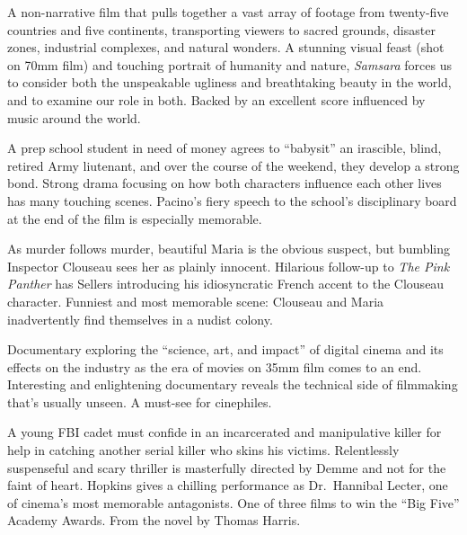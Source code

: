   A non-narrative film that pulls together a vast array of footage from twenty-five countries and five continents, transporting viewers to sacred grounds, disaster zones, industrial complexes, and natural wonders. A stunning visual feast (shot on 70mm film) and touching portrait of humanity and nature, \textit{Samsara} forces us to consider both the unspeakable ugliness and breathtaking beauty in the world, and to examine our role in both. Backed by an excellent score influenced by music around the world. \author{DW} 

   A prep school student in need of money agrees to ``babysit'' an irascible, blind, retired Army liutenant, and over the course of the weekend, they develop a strong bond. Strong drama focusing on how both characters influence each other lives has many touching scenes. Pacino's fiery speech to the school's disciplinary board at the end of the film is especially memorable. \author{DW} 

   As murder follows murder, beautiful Maria is the obvious suspect, but bumbling Inspector Clouseau sees her as plainly innocent. Hilarious follow-up to \textit{The Pink Panther} has Sellers introducing his idiosyncratic French accent to the Clouseau character. Funniest and most memorable scene: Clouseau and Maria inadvertently find themselves in a nudist colony. \author{DW} 

   Documentary exploring the ``science, art, and impact'' of digital cinema and its effects on the industry as the era of movies on 35mm film comes to an end. Interesting and enlightening documentary reveals the technical side of filmmaking that's usually unseen. A must-see for cinephiles. \author{DW}

   A young FBI cadet must confide in an incarcerated and manipulative killer for help in catching another serial killer who skins his victims. Relentlessly suspenseful and scary thriller is masterfully directed by Demme and not for the faint of heart. Hopkins gives a chilling performance as Dr.\ Hannibal Lecter, one of cinema's most memorable antagonists. One of three films to win the ``Big Five'' Academy Awards. From the novel by Thomas Harris. \author{DW} 

